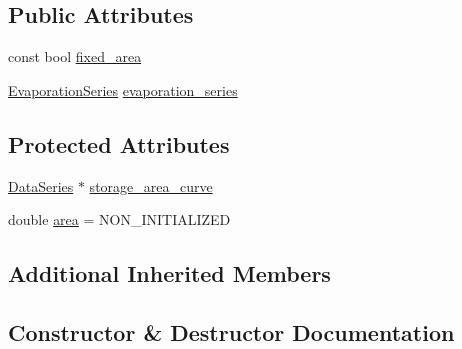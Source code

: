 \subsection*{Public Attributes}
\begin{DoxyCompactItemize}
\item 
const bool \mbox{\hyperlink{classReservoir_ad4b37aef4873071d1766baaccce5b8cf}{fixed\+\_\+area}}
\item 
\mbox{\hyperlink{classEvaporationSeries}{Evaporation\+Series}} \mbox{\hyperlink{classReservoir_a2d2d9b302c13703309bb798d24136810}{evaporation\+\_\+series}}
\end{DoxyCompactItemize}
\subsection*{Protected Attributes}
\begin{DoxyCompactItemize}
\item 
\mbox{\hyperlink{classDataSeries}{Data\+Series}} $\ast$ \mbox{\hyperlink{classReservoir_a46bd5b750963dfa9a57b247fd77ab8ff}{storage\+\_\+area\+\_\+curve}}
\item 
double \mbox{\hyperlink{classReservoir_a57ab55e0dde9e29a4ff97de98b09e458}{area}} = N\+O\+N\+\_\+\+I\+N\+I\+T\+I\+A\+L\+I\+Z\+ED
\end{DoxyCompactItemize}
\subsection*{Additional Inherited Members}


\subsection{Constructor \& Destructor Documentation}
\mbox{\label{classReservoir_ac9803ae5446e4e9a2631ce66817004cf}} 
